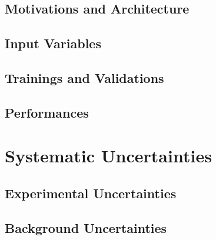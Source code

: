 \documentclass[edeposit,fullpage]{latex/uiucthesis2009}
\begin{document}
\section{Motivations and Architecture}
\section{Input Variables}
\section{Trainings and Validations}
\section{Performances}

\chapter{Systematic Uncertainties}
\section{Experimental Uncertainties}
\section{Background Uncertainties}
\end{document}
